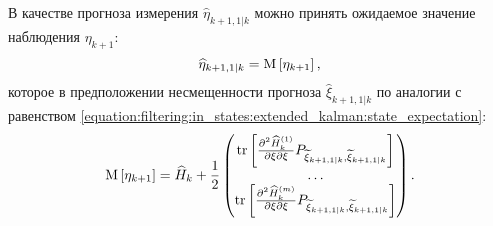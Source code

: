 В качестве прогноза измерения $\widehat{\eta}_{k+1,1|k}$ можно принять ожидаемое значение наблюдения $\eta_{k+1}$:
$$
    \widehat{\eta}_{k+1,1|k} = \mathrm{M} \left [ \eta_{k+1} \right ],
$$
которое в предположении несмещенности прогноза $\widehat{\xi}_{k+1,1|k}$ по аналогии с равенством
\eqref{equation:filtering:in_states:extended_kalman:state_expectation}:
$$
    \mathrm{M} \left [ \eta_{k+1} \right ]
        = \widehat{H}_k
        + \frac{1}{2}
            \begin{pmatrix}
                \mathrm{tr} \left [ \frac{\partial^2 \widehat{H}_k^{(1)}}{{\partial \xi}{\partial \xi}} P_{\widetilde{\xi}_{k+1,1|k}, \widetilde{\xi}_{k+1,1|k}} \right ] \\
                \dots \\
                \mathrm{tr} \left [ \frac{\partial^2 \widehat{H}_k^{(m)}}{{\partial \xi}{\partial \xi}} P_{\widetilde{\xi}_{k+1,1|k}, \widetilde{\xi}_{k+1,1|k}} \right ]
            \end{pmatrix}
        .
$$

